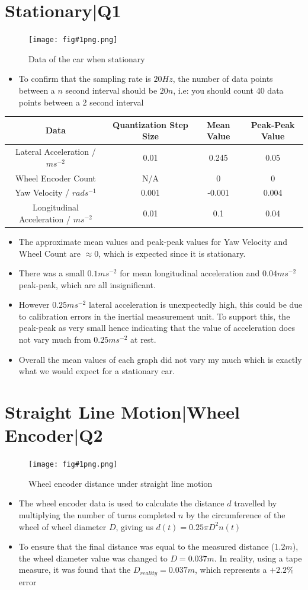 \documentclass{article}
\newcommand{\main}[4]{
    \section{#2}
    
    \begin{figure}[h]
        \begin{center}
        \texttt{[image: fig\#1png.png]} 
         \caption{#3}
        \label{fig:#1}      
        \end{center}
    
    \end{figure}
    
    #4
    \newpage
}
\newcommand{\bul}[1]{\begin{itemize}
    #1
\end{itemize}}
\begin{document}
\main{1}{Stationary|Q1}{Data of the car when stationary}{

\begin{itemize}
    \item To confirm that the sampling rate is $20 Hz$, the number of data points between a $n$ second interval should be $20n$, i.e: you should count 40 data points between a 2 second interval
\end{itemize}

    

\begin{table}[h]
\centering
\begin{tabular}{c|c|c|c}
Data & Quantization Step Size & Mean Value & Peak-Peak Value \\ \hline
Lateral Acceleration / $ms^{-2}$    &     0.01                    &   0.245         & 0.05                \\
Wheel Encoder Count     &              N/A           &      0      &  0               \\
Yaw Velocity / $rads^{-1}$     &                0.001         &    -0.001        &       0.004          \\
Longitudinal Acceleration / $ms^{-2}$     &     0.01                   & 0.1            &   0.04             
\end{tabular}
\end{table}

\begin{itemize}
    \item The approximate mean values and peak-peak values for Yaw Velocity and Wheel Count are $\approx 0$, which is expected since it is stationary. \item There was a small $0.1ms^{-2}$ for mean longitudinal acceleration and $0.04ms^{-2}$ peak-peak, which are all insignificant. \item However $0.25ms^{-2}$ lateral acceleration is unexpectedly high, this could be due to calibration errors in the inertial measurement unit. To support this, the peak-peak as very small hence indicating that the value of acceleration does not vary much from $0.25ms^{-2}$ at rest.\item Overall the mean values of each graph did not vary my much which is exactly what we would expect for a stationary car.
\end{itemize}


}
\main{2}{Straight Line Motion|Wheel Encoder|Q2}{Wheel encoder distance under straight line motion}{

\bul{
    \item The wheel encoder data is used to calculate the distance $d$ travelled by multiplying the number of turns completed $n$ by the circumference of the wheel of wheel diameter $D$, giving us $d(t)=0.25\pi D^2 n(t)$  
    
    \item To ensure that the final distance was equal to the measured distance ($1.2m$), the wheel diameter value was changed to $D=0.037m$. In reality, using a tape measure, it was found that the $D_{reality}=0.037m$, which represents a $+2.2\%$ error

}






}
\end{document}
